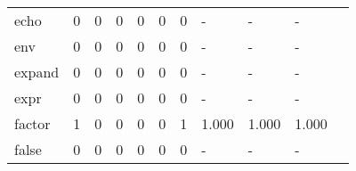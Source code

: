 \begin{longtable}{lp{1.2cm}p{1.2cm}p{1.2cm}p{1.2cm}p{1.2cm}p{1.2cm}p{1.2cm}p{1.2cm}p{1.2cm}p{1.2cm}}
echo      &                                     0 &                                                  0 &                                                  0 &                                                  0 &                                                  0 &                                                  0 &                                             - &                                                  - &                                                  - \\
env       &                                     0 &                                                  0 &                                                  0 &                                                  0 &                                                  0 &                                                  0 &                                             - &                                                  - &                                                  - \\
expand    &                                     0 &                                                  0 &                                                  0 &                                                  0 &                                                  0 &                                                  0 &                                             - &                                                  - &                                                  - \\
expr      &                                     0 &                                                  0 &                                                  0 &                                                  0 &                                                  0 &                                                  0 &                                             - &                                                  - &                                                  - \\
factor    &                                     1 &                                                  0 &                                                  0 &                                                  0 &                                                  0 &                                                  1 &                                         1.000 &                                              1.000 &                                              1.000 \\
false     &                                     0 &                                                  0 &                                                  0 &                                                  0 &                                                  0 &                                                  0 &                                             - &                                                  - &                                                  - \\

\end{longtable}
